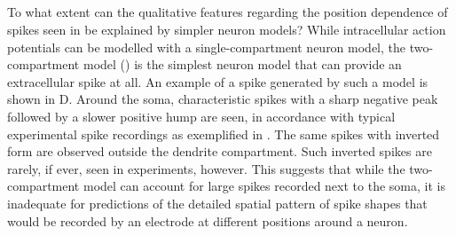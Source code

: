%
%



\subsection{}
\label{sec:Spikes:two-compartment}
To what extent can the qualitative features regarding the position dependence of spikes seen 
in  be explained by simpler neuron models? 
While intracellular action potentials can be modelled with a single-compartment neuron model, 
the two-compartment model () is the simplest neuron model that can provide an extracellular spike at all. An example of a spike generated by such a model is shown in D. Around the soma, characteristic spikes with a sharp negative peak followed by a slower positive hump are seen, in accordance with typical experimental spike recordings as exemplified in . The same spikes with inverted form are observed outside the dendrite compartment. Such inverted spikes are rarely, if ever, seen in experiments, however. This suggests that while the two-compartment model can account for large spikes recorded next to the soma, it is inadequate for 
predictions of  the detailed spatial pattern of spike shapes that would be recorded by an electrode at different positions around a neuron.   

